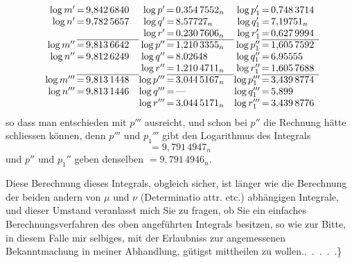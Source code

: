 \[
\begin{array}{r@{\,}c@{\,}l@{\quad}r@{\,}c@{\,}l@{\quad}r@{\,}c@{\,}l}
\log m'&=&9{,}842\,6840&\log p'&=&0{,}354\,7552_n&\log p_1'&=&0{,}748\,3714\\
\log n'&=&9{,}782\,5657&\log q'&=&8{,}57727_n&\log q_1'&=&7{,}19751_n\\
&&&\log r'&=&0{,}230\,7606_n&\log r_1'&=&0{,}627\,9994\\\cline{2-3}\cline{5-6}\cline{8-9}
\log m''&=&9{,}813\,6642&\log p''&=&1{,}210\,3355_n&\log p_1''&=&1{,}605\,7592\\
\log n''&=&9{,}812\,6249&\log q''&=&8{,}02648&\log q_1''&=&6{,}95555\\
&&&\log r''&=&1{,}210\,4711_n&\log r_1''&=&1{,}605\,7688\\\cline{2-3}\cline{5-6}\cline{8-9}
\log m'''&=&9{,}813\,1448&\log p'''&=&3{,}044\,5167_n&\log p_1'''&=&3{,}439\,8774\\
\log n'''&=&9{,}813\,1446&\log q'''&=&\text{—}&\log q_1'''&=&5{,}899\\
&&&\log r'''&=&3{,}044\,5171_n&\log r_1'''&=&3{,}439\,8776
\end{array}
\]
so dass man entschieden mit \(p'''\) ausreicht, und schon bei \(p''\) die Rechnung hätte schliessen können, denn \(p'''\) und \(p_1'''\) gibt den Logarithmus des Integrals
\[
=9{,}791\,4947_n
\]
und \(p''\) und \(p_1''\) geben denselben \(=9{,}791\,4946_n\).
\par Diese Berechnung dieses Integrals, obgleich sicher, ist länger wie die Berechnung der beiden andern von \(\mu\) und \(\nu\) (Determinatio attr. etc.) abhängigen Integrale, und dieser Umstand veranlasst mich Sie zu fragen, ob Sie ein einfaches Berechnungsverfahren des oben angeführten Integrals besitzen, so wie zur Bitte, in diesem Falle mir selbiges, mit der Erlaubniss zur angemessenen Bekanntmachung in meiner Abhandlung, gütigst mittheilen zu wollen.\quad\mbox{. . . . .\}}
\par
